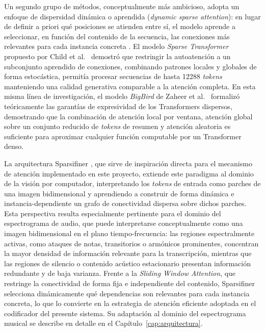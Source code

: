 Un segundo grupo de métodos, conceptualmente más ambicioso, adopta un
enfoque de dispersidad dinámica o aprendida (\textit{dynamic sparse
attention}): en lugar de definir a priori qué posiciones se atienden
entre sí, el modelo aprende a seleccionar, en función del contenido de
la secuencia, las conexiones más relevantes para cada instancia concreta
\cite{child2019generating}. El modelo \textit{Sparse Transformer}
propuesto por Child et al.\ \cite{child2019generating} demostró que
restringir la autoatención a un subconjunto aprendido de conexiones, combinando patrones locales y globales de forma estocástica, permitía procesar secuencias de hasta 12288 \textit{tokens} manteniendo
una calidad generativa comparable a la atención completa. En esta misma
línea de investigación, el modelo \textit{BigBird} de Zaheer et al.\
\cite{zaheer2020big} formalizó teóricamente las garantías de
expresividad de los Transformers dispersos, demostrando que la
combinación de atención local por ventana, atención global sobre un
conjunto reducido de \textit{tokens} de resumen y atención aleatoria es
suficiente para aproximar cualquier función computable por un Transformer
denso.

La arquitectura Sparsifiner \cite{wei2023sparsifiner}, que sirve de
inspiración directa para el mecanismo de atención implementado en este
proyecto, extiende este paradigma al dominio de la visión por computador,
interpretando los \textit{tokens} de entrada como parches de una imagen
bidimensional y aprendiendo a construir de forma dinámica e
instancia-dependiente un grafo de conectividad dispersa sobre dichos
parches. Esta perspectiva resulta especialmente pertinente para el dominio
del espectrograma de audio, que puede interpretarse conceptualmente como
una imagen bidimensional en el plano tiempo-frecuencia: las regiones
espectralmente activas, como ataques de notas, transitorios o armónicos
prominentes, concentran la mayor densidad de información relevante para
la transcripción, mientras que las regiones de silencio o contenido
acústico estacionario presentan información redundante y de baja
varianza. Frente a la \textit{Sliding Window Attention}, que restringe la
conectividad de forma fija e independiente del contenido, Sparsifiner
selecciona dinámicamente qué dependencias son relevantes para cada
instancia concreta, lo que lo convierte en la estrategia de atención
eficiente adoptada en el codificador del presente sistema. Su adaptación
al dominio del espectrograma musical se describe en detalle en el
Capítulo~\ref{cap:arquitectura}.



